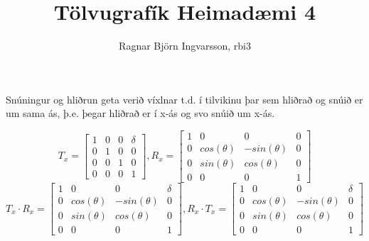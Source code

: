 \documentclass{article}
\title{Tölvugrafík Heimadæmi 4}
\author{Ragnar Björn Ingvarsson, rbi3}
\begin{document}
\renewcommand\thepage{}
	
	\maketitle

	\newpage
	\setcounter{page}{1}
	\renewcommand\thepage{\arabic{page}}

	\section{}

	Snúningur og hliðrun geta verið víxlnar t.d. í tilvikinu þar sem hliðrað 
	og snúið er um sama ás, þ.e. þegar hliðrað er í x-ás og svo snúið um 
	x-ás.

	\[T_x = \begin{bmatrix} 
		1 & 0 & 0 & \delta \\ 
		0 & 1 & 0 & 0 \\ 
		0 & 0 & 1 & 0 \\ 
		0 & 0 & 0 & 1 
		\end{bmatrix}, R_x = 
		\begin{bmatrix}
		1 & 0 & 0 & 0 \\
		0 & cos(\theta) & -sin(\theta) & 0 \\
		0 & sin(\theta) & cos(\theta) & 0 \\
		0 & 0 & 0 & 1
		\end{bmatrix}\]
		\[T_x \cdot R_x =
		\begin{bmatrix}
		1 & 0 & 0 & \delta \\
		0 & cos(\theta) & -sin(\theta) & 0 \\
		0 & sin(\theta) & cos(\theta) & 0 \\
		0 & 0 & 0 & 1
		\end{bmatrix}, 
		R_x \cdot T_x =
		\begin{bmatrix}
		1 & 0 & 0 & \delta \\
		0 & cos(\theta) & -sin(\theta) & 0 \\
		0 & sin(\theta) & cos(\theta) & 0 \\
		0 & 0 & 0 & 1
		\end{bmatrix}\]

		\section{}
\end{document}
